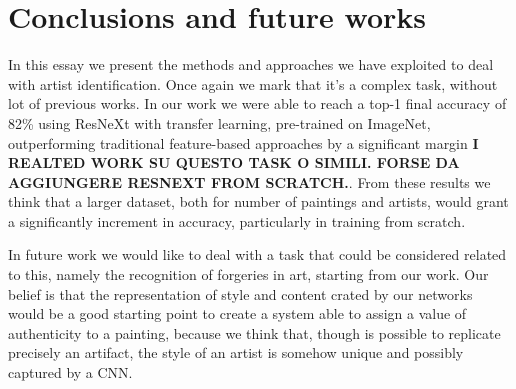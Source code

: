 \documentclass{article}
\begin{document}
\section{Conclusions and future works}\label{conclusions}
In this essay we present the methods and approaches we have exploited to deal with artist identification. Once again we mark that it's a complex task, without lot of previous works. 
In our work we were able to reach a top-1 final accuracy of 82\% using ResNeXt with transfer learning, pre-trained on ImageNet, outperforming traditional feature-based approaches by a significant margin\textbf{ I REALTED WORK SU QUESTO TASK O SIMILI. FORSE DA AGGIUNGERE RESNEXT FROM SCRATCH.}. From these results we think that a larger dataset, both for number of paintings and artists, would grant a significantly increment in accuracy, particularly in training from scratch.

In future work we would like to deal with a task that could be considered related to this, namely the recognition of forgeries in art, starting from our work. Our belief is that the representation of style and content crated by our networks would be a good starting point to create a system able to assign a value of authenticity to a painting, because we think that, though is possible to replicate precisely an artifact, the style of an artist is somehow unique and possibly captured by a CNN.
\end{document}
